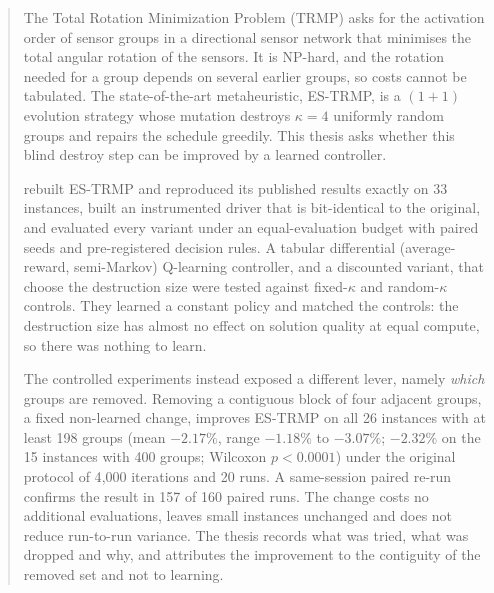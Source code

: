 \begin{abstract}
\begin{spacing}{1.3}

\addchaptertocentry{\abstractname} %

The Total Rotation Minimization Problem (TRMP) asks for the activation order of sensor groups in a directional sensor network that minimises the total angular rotation of the sensors. It is NP-hard, and the rotation needed for a group depends on several earlier groups, so costs cannot be tabulated. The state-of-the-art metaheuristic, ES-TRMP, is a $(1+1)$ evolution strategy whose mutation destroys $\kappa=4$ uniformly random groups and repairs the schedule greedily. This thesis asks whether this blind destroy step can be improved by a learned controller.

\pronounwe{} rebuilt ES-TRMP and reproduced its published results exactly on 33 instances, built an instrumented driver that is bit-identical to the original, and evaluated every variant under an equal-evaluation budget with paired seeds and pre-registered decision rules. A tabular differential (average-reward, semi-Markov) Q-learning controller, and a discounted variant, that choose the destruction size were tested against fixed-$\kappa$ and random-$\kappa$ controls. They learned a constant policy and matched the controls: the destruction size has almost no effect on solution quality at equal compute, so there was nothing to learn.

The controlled experiments instead exposed a different lever, namely \emph{which} groups are removed. Removing a contiguous block of four adjacent groups, a fixed non-learned change, improves ES-TRMP on all 26 instances with at least 198 groups (mean $-2.17\%$, range $-1.18\%$ to $-3.07\%$; $-2.32\%$ on the 15 instances with 400 groups; Wilcoxon $p<0.0001$) under the original protocol of 4{,}000 iterations and 20 runs. A same-session paired re-run confirms the result in 157 of 160 paired runs. The change costs no additional evaluations, leaves small instances unchanged and does not reduce run-to-run variance. The thesis records what was tried, what was dropped and why, and attributes the improvement to the contiguity of the removed set and not to learning.

\end{spacing}
\end{abstract}



